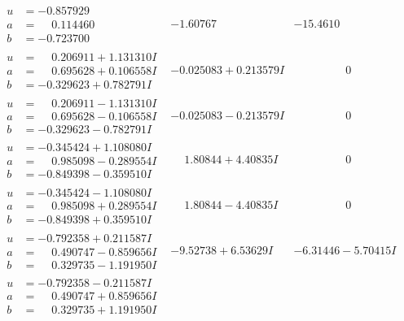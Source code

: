 \documentclass[1p]{elsarticle_modified}
\theoremstyle{definition}
\begin{document}
$$\begin{array}{c|c|c}
\begin{aligned}
u &= -0.857929\phantom{ +0.000000I} \\
a &= \phantom{-}0.114460\phantom{ +0.000000I} \\
b &= -0.723700\phantom{ +0.000000I}\end{aligned}
 & -1.60767\phantom{ +0.000000I} & -15.4610\phantom{ +0.000000I} \\ \hline\begin{aligned}
u &= \phantom{-}0.206911 + 1.131310 I \\
a &= \phantom{-}0.695628 + 0.106558 I \\
b &= -0.329623 + 0.782791 I\end{aligned}
 & -0.025083 + 0.213579 I & \phantom{-0.000000 } 0 \\ \hline\begin{aligned}
u &= \phantom{-}0.206911 - 1.131310 I \\
a &= \phantom{-}0.695628 - 0.106558 I \\
b &= -0.329623 - 0.782791 I\end{aligned}
 & -0.025083 - 0.213579 I & \phantom{-0.000000 } 0 \\ \hline\begin{aligned}
u &= -0.345424 + 1.108080 I \\
a &= \phantom{-}0.985098 - 0.289554 I \\
b &= -0.849398 - 0.359510 I\end{aligned}
 & \phantom{-}1.80844 + 4.40835 I & \phantom{-0.000000 } 0 \\ \hline\begin{aligned}
u &= -0.345424 - 1.108080 I \\
a &= \phantom{-}0.985098 + 0.289554 I \\
b &= -0.849398 + 0.359510 I\end{aligned}
 & \phantom{-}1.80844 - 4.40835 I & \phantom{-0.000000 } 0 \\ \hline\begin{aligned}
u &= -0.792358 + 0.211587 I \\
a &= \phantom{-}0.490747 - 0.859656 I \\
b &= \phantom{-}0.329735 - 1.191950 I\end{aligned}
 & -9.52738 + 6.53629 I & -6.31446 - 5.70415 I \\ \hline\begin{aligned}
u &= -0.792358 - 0.211587 I \\
a &= \phantom{-}0.490747 + 0.859656 I \\
b &= \phantom{-}0.329735 + 1.191950 I\end{aligned}

\end{array}$$
\end{document}
